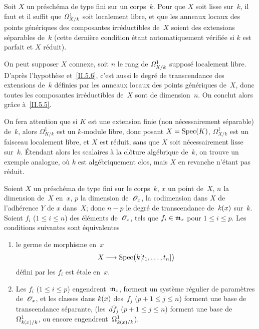 \begin{corollaire}
\label{II.5.7} Soit $X$ un pr\'esch\'ema de type fini sur un
corps~$k$. Pour que $X$ soit lisse sur~$k$, il faut et il suffit que
$\it{\Omega}^1_{X/k}$
soit localement libre, et que les anneaux locaux des
points g\'en\'eriques des composantes irr\'eductibles de~$X$
soient des extensions s\'eparables de~$k$ (cette derni\`ere
condition \'etant automatiquement v\'erifi\'ee si $k$ est
parfait et $X$ r\'eduit).
\end{corollaire}

On peut supposer $X$ connexe, soit $n$ le rang de
$\it{\Omega}^1_{X/k}$
suppos\'e localement libre. D'apr\`es l'hypoth\`ese
et~\ref{II.5.6}, c'est aussi le degr\'e de transcendance des
extensions
de~$k$ d\'efinies par les anneaux locaux des points
g\'en\'eriques de~$X$, donc toutes les composantes
irr\'eductibles de~$X$ sont de dimension~$n$. On conclut alors
gr\^ace \`a~\ref{II.5.5}.

On fera attention que si $K$ est une extension finie (non
n\'ecessairement s\'eparable) de~$k$, alors $\Omega^1_{K/k}$ est
un $k$-module libre, donc posant $X=\Spec(K)$, $\Omega^1_{X/k}$ est un
faisceau localement libre, et $X$ est r\'eduit, sans que $X$ soit
n\'ecessairement lisse sur~$k$. \'Etendant alors les scalaires \`a
la cl\^oture alg\'ebrique de~$k$, on trouve un exemple analogue,
o\`u $k$ est alg\'ebriquement clos, mais $X$ en revanche
n'\'etant pas r\'eduit.

\begin{corollaire}\label{II.5.8}
Soient $X$ un pr\'esch\'ema de type fini sur le corps~$k$, $x$ un
point de~$X$, $n$ la dimension de~$X$ en~$x$, $p$ la dimension
de~$\cal{O}_x$,
\ie la codimension dans $X$ de l'adh\'erence $Y$ de
$x$ dans~$X$; donc $n-p$ le degr\'e de transcendance
de~$\kres(x)$
sur~$k$. Soient $f_i$ ($1\leq i\leq n$) des \'el\'ements
de~$\cal{O}_x$, tels que $f_i\in \goth{m}_x$ pour $1\leq i\leq p$. Les
conditions suivantes sont \'equivalentes

\begin{enumerate}
\item[(i)] le germe de morphisme en~$x$
$$
X\to \Spec\bigl(k[t_1,\dots,t_n]\bigr)
$$
d\'efini par les $f_i$ est \'etale en~$x$.
\item[(ii)] Les $f_i$ ($1\leq i\leq p$)
engendrent~$\goth{m}_x$,
\ie forment un syst\`eme r\'egulier de param\`etres
de~$\cal{O}_x$, et les classes dans
$\kres(x)$ des~$f_j$ ($p+1\leq j\leq n$) forment une base de transcendance s\'eparante, (\ie les~$d\overline{f}_j$ ($p+1\leq j\leq n$) forment une base
de~$\Omega^1_{\kres(x)/k}$, ou encore engendrent~$\Omega^1_{\kres(x)/k}$).
\end{enumerate}
\end{corollaire}

